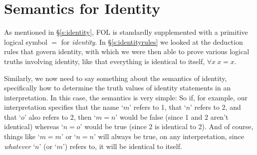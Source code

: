 

\section{Semantics for Identity}

As mentioned in  \S\ref{s:identity}, FOL is standardly supplemented with a primitive logical symbol $=$ for \emph{identity}. In \S\ref{s:identityrules} we looked at the deduction rules that govern identity, with which we were then able to prove various logical truths involving identity, like that everything is identical to itself, $\forall x  \ x=x$.

Similarly, we now need to say something about the semantics of identity, specifically how to determine the truth values of identity statements in an interpretation.  In this case, the semantics is very simple:%
So if, for example, our interpretation specifies that the name `$m$' refers to 1, that `$n$' refers to 2, and that `$o$' also refers to 2, then `$m = n$' would be false (since 1 and 2 aren't identical) whereas `$n = o$' would be true (since 2 is identical to 2).  And of course, things like `$m = m$' or `$n = n$' will always be true, on any interpretation, since \emph{whatever} `$n$' (or `$m$') refers to, it will be identical to itself.



